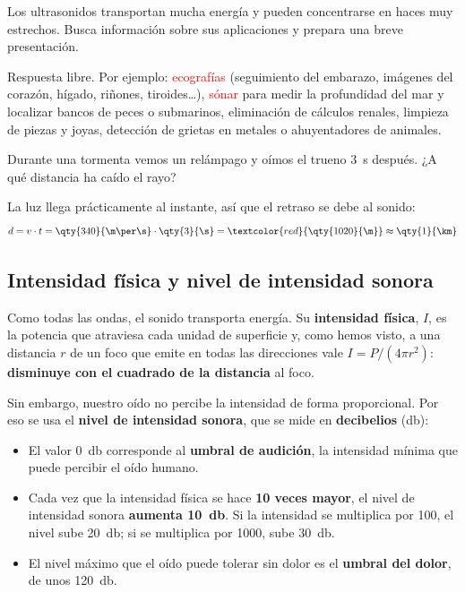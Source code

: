 \begin{exercise}
    Los ultrasonidos transportan mucha energía y pueden concentrarse en haces muy estrechos. Busca información sobre sus aplicaciones y prepara una breve presentación.
    \begin{solu}
        Respuesta libre. Por ejemplo: \textcolor{red}{ecografías} (seguimiento del embarazo, imágenes del corazón, hígado, riñones, tiroides\ldots), \textcolor{red}{sónar} para medir la profundidad del mar y localizar bancos de peces o submarinos, eliminación de cálculos renales, limpieza de piezas y joyas, detección de grietas en metales o ahuyentadores de animales.
    \end{solu}
\end{exercise}

\begin{example}
    Durante una tormenta vemos un relámpago y oímos el trueno \qty{3}{\s} después. ¿A qué distancia ha caído el rayo?

    La luz llega prácticamente al instante, así que el retraso se debe al sonido:
    \[ d = v \cdot t = \qty{340}{\m\per\s} \cdot \qty{3}{\s} = \textcolor{red}{\qty{1020}{\m}} \approx \qty{1}{\km} \]
\end{example}

\subsection{Intensidad física y nivel de intensidad sonora}

Como todas las ondas, el sonido transporta energía. Su \textbf{intensidad física}, \(I\), es la potencia que atraviesa cada unidad de superficie y, como hemos visto, a una distancia \(r\) de un foco que emite en todas las direcciones vale \(I = P/(4\pi r^2)\): \textbf{disminuye con el cuadrado de la distancia} al foco.

Sin embargo, nuestro oído no percibe la intensidad de forma proporcional. Por eso se usa el \textbf{nivel de intensidad sonora}, que se mide en \textbf{decibelios} (\unit{\decibel}):
\begin{itemize}
    \item El valor \qty{0}{\decibel} corresponde al \textbf{umbral de audición}, la intensidad mínima que puede percibir el oído humano.
    \item Cada vez que la intensidad física se hace \textbf{10 veces mayor}, el nivel de intensidad sonora \textbf{aumenta \qty{10}{\decibel}}. Si la intensidad se multiplica por 100, el nivel sube \qty{20}{\decibel}; si se multiplica por 1000, sube \qty{30}{\decibel}.
    \item El nivel máximo que el oído puede tolerar sin dolor es el \textbf{umbral del dolor}, de unos \qty{120}{\decibel}.
\end{itemize}

